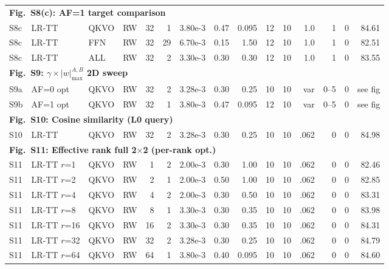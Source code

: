 \documentclass[AMA,LATO1COL]{WileyNJDv5}
\newcommand{\SIEndSection}{\FloatBarrier\clearpage}
\begin{document}
{\begin{longtable}{@{}l l l l r r r r r r r r r r r@{}}
\multicolumn{15}{l}{\cellcolor{HeadGray}\textbf{Fig.~S8(c): AF=1 target comparison}} \\
S8c & LR-TT & QKVO & RW & 32 & 1 & 3.80e-3 & 0.47 & 0.095 & 12 & 10 & 1.0 & 1 & 0 & 84.61 \\
S8c & LR-TT & FFN & RW & 32 & 29 & 6.70e-3 & 0.15 & 1.50 & 12 & 10 & 1.0 & 1 & 0 & 82.51 \\
S8c & LR-TT & ALL & RW & 32 & 2 & 3.30e-3 & 0.30 & 0.30 & 12 & 10 & 1.0 & 1 & 0 & 83.55 \\
\midrule

\multicolumn{15}{l}{\cellcolor{HeadGray}\textbf{Fig.~S9: $\gamma \times |w|_{\max}^{A,B}$ 2D sweep}} \\
S9a & AF=0 opt & QKVO & RW & 32 & 2 & 3.28e-3 & 0.30 & 0.25 & 10 & 10 & var & 0--5 & 0 & see fig \\
S9b & AF=1 opt & QKVO & RW & 32 & 1 & 3.80e-3 & 0.47 & 0.095 & 12 & 10 & var & 0--5 & 0 & see fig \\
\midrule

\multicolumn{15}{l}{\cellcolor{HeadGray}\textbf{Fig.~S10: Cosine similarity (L0 query)}} \\
S10 & LR-TT & QKVO & RW & 32 & 2 & 3.28e-3 & 0.30 & 0.25 & 10 & 10 & .062 & 0 & 0 & 84.98 \\
\midrule

\multicolumn{15}{l}{\cellcolor{HeadGray}\textbf{Fig.~S11: Effective rank full 2$\times$2 (per-rank opt.)}} \\
S11 & LR-TT $r$=1 & QKVO & RW & 1 & 2 & 2.00e-3 & 0.30 & 1.00 & 10 & 10 & .062 & 0 & 0 & 82.46 \\
S11 & LR-TT $r$=2 & QKVO & RW & 2 & 1 & 2.00e-3 & 0.50 & 1.00 & 10 & 10 & .062 & 0 & 0 & 82.85 \\
S11 & LR-TT $r$=4 & QKVO & RW & 4 & 2 & 2.00e-3 & 0.30 & 0.50 & 10 & 10 & .062 & 0 & 0 & 83.31 \\
S11 & LR-TT $r$=8 & QKVO & RW & 8 & 1 & 3.30e-3 & 0.30 & 0.35 & 10 & 10 & .062 & 0 & 0 & 83.98 \\
S11 & LR-TT $r$=16 & QKVO & RW & 16 & 2 & 3.30e-3 & 0.30 & 0.35 & 10 & 10 & .062 & 0 & 0 & 84.31 \\
S11 & LR-TT $r$=32 & QKVO & RW & 32 & 2 & 3.28e-3 & 0.30 & 0.25 & 10 & 10 & .062 & 0 & 0 & 84.79 \\
S11 & LR-TT $r$=64 & QKVO & RW & 64 & 1 & 3.80e-3 & 0.40 & 0.095 & 10 & 10 & .062 & 0 & 0 & 84.60 \\

\end{longtable}
}

\SIEndSection
\renewcommand{\arraystretch}{1.10}


\end{document}
